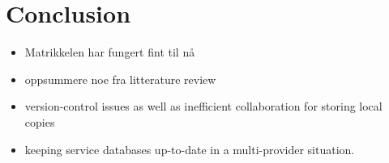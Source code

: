 \chapter{Conclusion}

\begin{itemize}
	\item Matrikkelen har fungert fint til nå
	\item oppsummere noe fra litterature review
	\item version-control issues as well as inefficient collaboration for storing local copies
	\item keeping service databases up-to-date in a multi-provider situation. %
	
\end{itemize}










